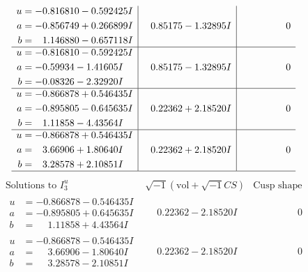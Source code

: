 \documentclass[1p]{elsarticle_modified}
\theoremstyle{definition}
\newcommand{\I}{\sqrt{-1}}
\begin{document}
$$\begin{array}{c|c|c}
\begin{aligned}
u &= -0.816810 - 0.592425 I \\
a &= -0.856749 + 0.266899 I \\
b &= \phantom{-}1.146880 - 0.657118 I\end{aligned}
 & \phantom{-}0.85175 - 1.32895 I & \phantom{-0.000000 } 0 \\ \hline\begin{aligned}
u &= -0.816810 - 0.592425 I \\
a &= -0.59934 - 1.41605 I \\
b &= -0.08326 - 2.32920 I\end{aligned}
 & \phantom{-}0.85175 - 1.32895 I & \phantom{-0.000000 } 0 \\ \hline\begin{aligned}
u &= -0.866878 + 0.546435 I \\
a &= -0.895805 - 0.645635 I \\
b &= \phantom{-}1.11858 - 4.43564 I\end{aligned}
 & \phantom{-}0.22362 + 2.18520 I & \phantom{-0.000000 } 0 \\ \hline\begin{aligned}
u &= -0.866878 + 0.546435 I \\
a &= \phantom{-}3.66906 + 1.80640 I \\
b &= \phantom{-}3.28578 + 2.10851 I\end{aligned}
 & \phantom{-}0.22362 + 2.18520 I & \phantom{-0.000000 } 0\\
 \hline 
 \end{array}$$\newpage$$\begin{array}{c|c|c}  
\text{Solutions to }I^u_{3}& \I (\text{vol} + \sqrt{-1}CS) & \text{Cusp shape}\\
 \hline 
\begin{aligned}
u &= -0.866878 - 0.546435 I \\
a &= -0.895805 + 0.645635 I \\
b &= \phantom{-}1.11858 + 4.43564 I\end{aligned}
 & \phantom{-}0.22362 - 2.18520 I & \phantom{-0.000000 } 0 \\ \hline\begin{aligned}
u &= -0.866878 - 0.546435 I \\
a &= \phantom{-}3.66906 - 1.80640 I \\
b &= \phantom{-}3.28578 - 2.10851 I\end{aligned}
 & \phantom{-}0.22362 - 2.18520 I & \phantom{-0.000000 } 0 \\ \hline\begin{aligned}

\end{aligned}
\end{array}$$
\end{document}
